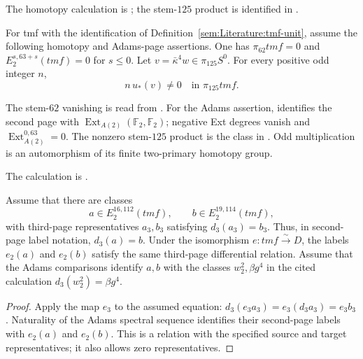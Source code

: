 \begin{proposition}
\label{sem:Literature:tmf-hurewicz}
The homotopy calculation is \cite[Figure 1.1]{tmf}; the stem-$125$ product is identified in \cite[Theorem 11.80 and Proposition 11.83]{BR21}.\par

For tmf with the identification of
Definition~\ref{sem:Literature:tmf-unit}, assume the following
homotopy and Adams-page assertions.
One has $\pi_{62}\mathit{tmf}=0$ and $E_2^{s,63+s}(\mathit{tmf})=0$ for $s\le0$. Let $v=\bar\kappa^4w\in\pi_{125}S^0$. For every positive odd integer $n$,
\[n\,u_*(v)\ne0\quad\text{in }\pi_{125}\mathit{tmf}.\]

The stem-$62$ vanishing is read from \cite[Figure 1.1]{tmf}.
For the Adams assertion, \cite[Section 0.5]{BR21} identifies the
second page with $\operatorname{Ext}_{A(2)}(\mathbb F_2,\mathbb F_2)$;
negative Ext degrees vanish and $\operatorname{Ext}_{A(2)}^{0,63}=0$.
The nonzero stem-$125$ product is the class in
\cite[Proposition 11.83]{BR21}. Odd multiplication is an automorphism
of its finite two-primary homotopy group.

\end{proposition}

\begin{theorem}
\label{sem:Literature:tmf-d-three}
The calculation is \cite[Theorem 5.18 and Table 5.4]{BR21}.\par

Assume that there are classes
\[
 a\in E_2^{16,112}(\mathit{tmf}),\qquad
 b\in E_2^{19,114}(\mathit{tmf}),
\]
with third-page representatives $a_3,b_3$ satisfying $d_3(a_3)=b_3$.
Thus, in second-page label notation, $d_3(a)=b$. Under the
isomorphism $e:\mathit{tmf}\xrightarrow{\sim}D$, the labels $e_2(a)$
and $e_2(b)$ satisfy the same third-page differential relation.
Assume that the Adams comparisons identify $a,b$ with the classes
$w_2^2,\beta g^4$ in the cited calculation
$d_3(w_2^2)=\beta g^4$.


\end{theorem}
\begin{proof}
Apply the map $e_3$ to the assumed equation:
$d_3(e_3a_3)=e_3(d_3a_3)=e_3b_3$. Naturality of the Adams spectral
sequence identifies their second-page labels with $e_2(a)$ and $e_2(b)$.
This is a relation with the specified source and target representatives;
it also allows zero representatives.
\end{proof}


